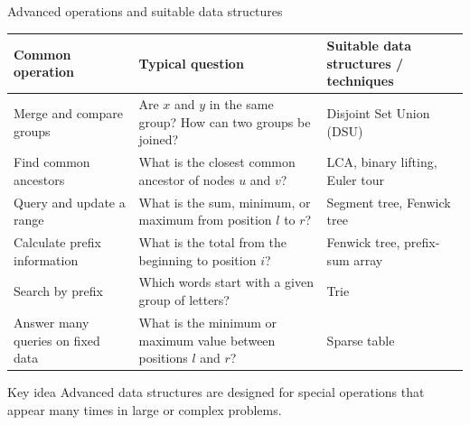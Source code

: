 \documentclass[aspectratio=169]{beamer}
\begin{document}
\begin{frame}{Advanced operations and suitable data structures}
  \scriptsize

  \begin{center}
    \renewcommand{\arraystretch}{1.35}
    \begin{tabular}{p{}p{}p{}}
      \toprule
      \textbf{Common operation} & \textbf{Typical question} & \textbf{Suitable data structures / techniques} \\
      \midrule
      Merge and compare groups & Are $x$ and $y$ in the same group? How can two groups be joined? & Disjoint Set Union (DSU) \\
      Find common ancestors & What is the closest common ancestor of nodes $u$ and $v$? & LCA, binary lifting, Euler tour \\
      Query and update a range & What is the sum, minimum, or maximum from position $l$ to $r$? & Segment tree, Fenwick tree \\
      Calculate prefix information & What is the total from the beginning to position $i$? & Fenwick tree, prefix-sum array \\
      Search by prefix & Which words start with a given group of letters? & Trie \\
      Answer many queries on fixed data & What is the minimum or maximum value between positions $l$ and $r$? & Sparse table \\
      \bottomrule
    \end{tabular}
  \end{center}

  \vspace{0.3cm}

  \begin{alertblock}{Key idea}
    Advanced data structures are designed for special operations that appear many times in large or complex problems.
  \end{alertblock}
\end{frame}
\end{document}
